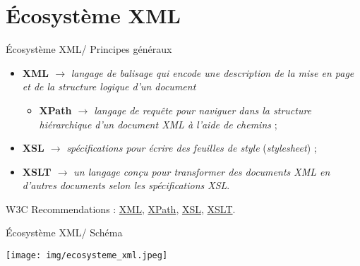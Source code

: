 \documentclass{beamer}
\begin{document}
      \section{Écosystème XML}
      \begin{frame}{Écosystème XML/ Principes généraux}
      \Large
      \begin{itemize}
          \item \textbf{XML $\rightarrow$} \textit{langage de balisage qui encode une description de la mise en page et de la structure logique d'un document}
          \begin{itemize}
              \item \textbf{XPath $\rightarrow$} \textit{langage de requête pour naviguer dans la structure hiérarchique d'un document XML à l'aide de chemins} ;
          \end{itemize}
          \bigskip
          \item \textbf{XSL $\rightarrow$} \textit{spécifications pour écrire des feuilles de style} (\textit{stylesheet}) ;
          \bigskip
          \item \textbf{XSLT $\rightarrow$} \textit{un langage conçu pour transformer des documents XML en d'autres documents selon les spécifications XSL}.
      \end{itemize}
       
       \footnotesize W3C Recommendations : \href{https://www.w3.org/TR/xml11/}{XML}, \href{https://www.w3.org/TR/xpath-31/}{XPath}, \href{https://www.w3.org/TR/xsl/}{XSL}, \href{https://www.w3.org/TR/xslt-30/}{XSLT}.
       
      \end{frame}
      
      \begin{frame}{Écosystème XML/ Schéma}
          \begin{center}
              \texttt{[image: img/ecosysteme\_xml.jpeg]}
          \end{center}
      \end{frame}
      
\end{document}
